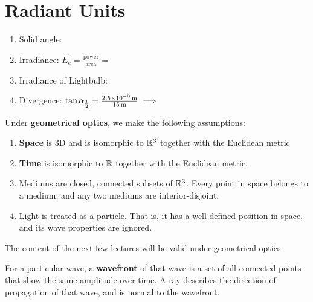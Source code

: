 \chapter{Radiant Units}

\begin{example}
    \spacebeforelist %
    \begin{enumerate}
        \item Solid angle:
        \item Irradiance: $E_e = \frac{\text{power}}{\text{area}} = $
        \item Irradiance of Lightbulb:
        \item Divergence: $\tan \alpha_{\frac{1}{2}} = \frac{\qty{2.5E-3}{\metre}}{\qty{15}{\metre}} \implies$
    \end{enumerate}
\end{example}

\begin{definition} %
    Under \textbf{geometrical optics}, we make the following assumptions:
    \begin{enumerate}
        \item \textbf{Space} is 3D and is isomorphic to $\mathbb{R}^3$ together with the Euclidean metric
        \item \textbf{Time} is isomorphic to $\mathbb{R}$ together with the Euclidean metric,
        \item Mediums are closed, connected subsets of $\mathbb{R}^3$. Every point in space belongs to a medium, and any two mediums are interior-disjoint.
        \item Light is treated as a particle. That is, it has a well-defined position in space, and its wave properties are ignored.
    \end{enumerate}
\end{definition}

\begin{remark}
    The content of the next few lectures will be valid under geometrical optics. 
\end{remark}

\begin{definition}[a ray]
    For a particular wave, a \textbf{wavefront} of that wave is a set of all connected points that show the same amplitude over time. A ray describes the direction of propagation of that wave, and is normal to the wavefront.
\end{definition}

